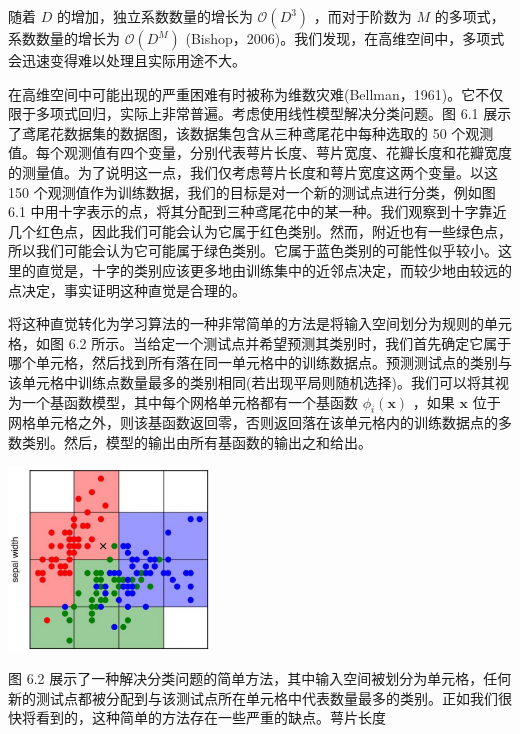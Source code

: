 \documentclass[10pt]{report}
\begin{document}
随着 \(D\) 的增加，独立系数数量的增长为 \(\mathcal{O}\left( {D}^{3}\right)\) ，而对于阶数为 \(M\) 的多项式，系数数量的增长为 \(\mathcal{O}\left( {D}^{M}\right)\) (Bishop，2006)。我们发现，在高维空间中，多项式会迅速变得难以处理且实际用途不大。

在高维空间中可能出现的严重困难有时被称为维数灾难(Bellman，1961)。它不仅限于多项式回归，实际上非常普遍。考虑使用线性模型解决分类问题。图 6.1 展示了鸢尾花数据集的数据图，该数据集包含从三种鸢尾花中每种选取的 50 个观测值。每个观测值有四个变量，分别代表萼片长度、萼片宽度、花瓣长度和花瓣宽度的测量值。为了说明这一点，我们仅考虑萼片长度和萼片宽度这两个变量。以这 150 个观测值作为训练数据，我们的目标是对一个新的测试点进行分类，例如图 6.1 中用十字表示的点，将其分配到三种鸢尾花中的某一种。我们观察到十字靠近几个红色点，因此我们可能会认为它属于红色类别。然而，附近也有一些绿色点，所以我们可能会认为它可能属于绿色类别。它属于蓝色类别的可能性似乎较小。这里的直觉是，十字的类别应该更多地由训练集中的近邻点决定，而较少地由较远的点决定，事实证明这种直觉是合理的。

将这种直觉转化为学习算法的一种非常简单的方法是将输入空间划分为规则的单元格，如图 6.2 所示。当给定一个测试点并希望预测其类别时，我们首先确定它属于哪个单元格，然后找到所有落在同一单元格中的训练数据点。预测测试点的类别与该单元格中训练点数量最多的类别相同(若出现平局则随机选择)。我们可以将其视为一个基函数模型，其中每个网格单元格都有一个基函数 \({\phi }_{i}\left( \mathbf{x}\right)\) ，如果 \(\mathbf{x}\) 位于网格单元格之外，则该基函数返回零，否则返回落在该单元格内的训练数据点的多数类别。然后，模型的输出由所有基函数的输出之和给出。

\begin{center}
\includegraphics[max width=0.4\textwidth]{images/0194e279-9b28-703a-88f4-c3ac21e2010d_193_949_346_602_550_0.jpg}
\end{center}
\hspace*{3em} 

图 6.2 展示了一种解决分类问题的简单方法，其中输入空间被划分为单元格，任何新的测试点都被分配到与该测试点所在单元格中代表数量最多的类别。正如我们很快将看到的，这种简单的方法存在一些严重的缺点。萼片长度
\end{document}
